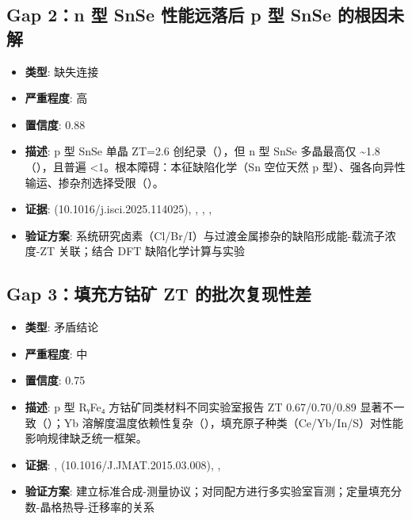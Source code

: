 \documentclass[12pt,a4paper]{ctexart}
\providecommand{\tightlist}{%
  \setlength{\itemsep}{0pt}\setlength{\parskip}{0pt}}
\begin{document}
\subsection{Gap 2：n 型 SnSe 性能远落后 p 型 SnSe 的根因未解}\label{gap:gap-2n-ux578b-snse-ux6027ux80fdux8fdcux843dux540e-p-ux578b-snse-ux7684ux6839ux56e0ux672aux89e3}

\begin{itemize}
\tightlist
\item
  \textbf{类型}: 缺失连接
\item
  \textbf{严重程度}: 高
\item
  \textbf{置信度}: 0.88
\item
  \textbf{描述}: p 型 SnSe 单晶 ZT=2.6 创纪录（\cite{TE113}），但 n 型 SnSe 多晶最高仅 \textasciitilde1.8（\cite{TE115}），且普遍 \textless1。根本障碍：本征缺陷化学（Sn 空位天然 p 型）、强各向异性输运、掺杂剂选择受限（\cite{TE122}）。
\item
  \textbf{证据}: \cite{TE122} (10.1016/j.isci.2025.114025), \cite{TE115}, \cite{TE113}, \cite{TE119}, \cite{TE117}
\item
  \textbf{验证方案}: 系统研究卤素（Cl/Br/I）与过渡金属掺杂的缺陷形成能-载流子浓度-ZT 关联；结合 DFT 缺陷化学计算与实验
\end{itemize}

\subsection{Gap 3：填充方钴矿 ZT 的批次复现性差}\label{gap:gap-3ux586bux5145ux65b9ux94b4ux77ff-zt-ux7684ux6279ux6b21ux590dux73b0ux6027ux5dee}

\begin{itemize}
\tightlist
\item
  \textbf{类型}: 矛盾结论
\item
  \textbf{严重程度}: 中
\item
  \textbf{置信度}: 0.75
\item
  \textbf{描述}: p 型 RᵧFe₄ 方钴矿同类材料不同实验室报告 ZT 0.67/0.70/0.89 显著不一致（\cite{TE048}）；Yb 溶解度温度依赖性复杂（\cite{TE035}），填充原子种类（Ce/Yb/In/S）对性能影响规律缺乏统一框架。
\item
  \textbf{证据}: \cite{TE048}, \cite{TE035} (10.1016/J.JMAT.2015.03.008), \cite{TE037}, \cite{TE051}
\item
  \textbf{验证方案}: 建立标准合成-测量协议；对同配方进行多实验室盲测；定量填充分数-晶格热导-迁移率的关系
\end{itemize}
\end{document}
